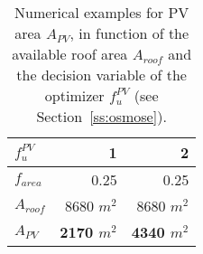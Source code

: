 \begin{table}[htp]
	\centering
	\caption{Numerical examples for PV area $A_{PV}$, in function of the available roof area $A_{roof}$ and the decision variable of the optimizer $f_{u}^{PV}$ (see Section~\ref{ss:osmose}).}
	\label{tab:pv}
	\begin{tabular}{lrr} \toprule
		$f_{u}^{PV}$			& 1	& 2\\  \midrule
		$f_{area}$	 & 0.25	& 0.25 \\
		$A_{roof}$          & 8680 $m^2$   & 8680 $m^2$ \\
		\textbf{$A_{PV}$}	 & \textbf{	2170 $m^2$}	& \textbf{4340 $m^2$}\\ \bottomrule
	\end{tabular}
\end{table}